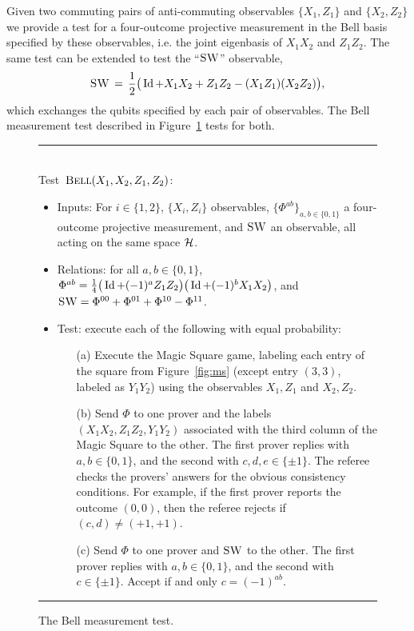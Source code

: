Given two commuting pairs of anti-commuting observables $\{X_1,Z_1\}$ and $\{X_2,Z_2\}$ we provide a test for a four-outcome projective measurement in the Bell basis specified by these observables, i.e. the joint eigenbasis of $X_1X_2$ and $Z_1Z_2$. The same test can be extended to test the ``$\textsc{SW}$'' observable,
\begin{equation}\label{eq:def-swap}
 \textsc{SW} \,=\, \frac{1}{2} \big( \mathop{\rm Id}\nolimits + X_1X_2 + Z_1Z_2 - (X_1Z_1)(X_2Z_2) \big),
\end{equation}
 which exchanges the  qubits specified by each pair of observables. The Bell measurement test described in Figure~\ref{fig:bell} tests for both. 


\begin{figure}[H]
\rule[1ex]{\textwidth}{0.5pt}\\
\justifying
Test~$\textsc{Bell}(X_1,X_2,Z_1,Z_2)$:
\begin{itemize}
    \item Inputs: For $i\in\{1,2\}$, $\{X_i,Z_i\}$ observables, $\{\Phi^{ab}\}_{a,b\in\{0,1\}}$ a four-outcome projective measurement, and $\textsc{SW}$ an observable, all acting on the same space $\mathcal{H}$.
    \item Relations: for all $a,b\in\{0,1\}$, $\Phi^{ab} = \frac{1}{4}\big(\mathop{\rm Id}\nolimits+(-1)^a Z_1Z_2\big)\big(\mathop{\rm Id}\nolimits+(-1)^bX_1X_2\big)$, and $\textsc{SW} = \Phi^{00} + \Phi^{01} + \Phi^{10} - \Phi^{11}$.   
    \item Test: execute each of the following with equal probability:
		\begin{enumerate}
		\item[(a)] Execute the Magic Square game, labeling each entry of the square from Figure~\ref{fig:ms} (except entry $(3,3)$, labeled as $Y_1Y_2$) using the observables $X_1,Z_1$ and $X_2,Z_2$.
		\item[(b)] Send $\Phi$ to one prover and the labels $(X_1X_2,Z_1Z_2,Y_1Y_2)$ associated with the third column of the Magic Square to the other.  The first prover replies with $a,b\in\{0,1\}$, and the second with $c,d,e\in \{\pm 1\}$. The referee checks the provers' answers for the obvious consistency conditions. For example, if the first prover reports the outcome $(0,0)$, then the referee rejects if $(c,d)\neq (+1,+1)$. 
		\item[(c)] Send $\Phi$ to one prover and $\textsc{SW}$ to the other. The first prover replies with $a,b\in\{0,1\}$, and the second with $c\in \{\pm 1\}$. Accept if and only $c=(-1)^{ab}$. 
		\end{enumerate}
\end{itemize}
\rule[2ex]{\textwidth}{0.5pt}\vspace{-.5cm}
\caption{The Bell measurement test.}
\label{fig:bell}
\end{figure}


